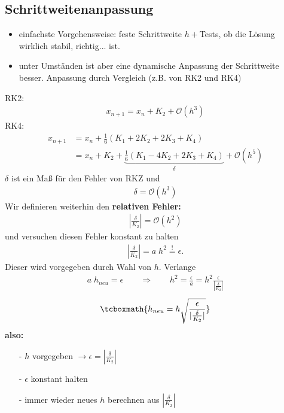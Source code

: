 \documentclass[12pt]{article}
\begin{document}
\subsection{Schrittweitenanpassung}
\begin{itemize}
\item einfachste Vorgehensweise: feste Schrittweite $h +$Tests, ob die Lösung wirklich stabil, richtig... ist.
\item unter Umständen ist aber eine dynamische Anpassung der Schrittweite besser. Anpassung durch Vergleich (z.B. von RK2 und RK4) \\
\end{itemize}

RK2: \begin{align}
x_{n+1} = x_n + K_2 + \mathcal{O}(h^3)
\end{align}
RK4: \begin{align}
x_{n+1} &= x_n + \frac{1}{6} (K_1 + 2K_2 +2K_3 + K_4) \\
&= x_n + K_2 + \underbrace{\frac{1}{6} (K_1 - 4K_2 + 2K_3 +K_4)}_\delta + \mathcal{O}(h^5)
\end{align}
$\delta$ ist ein Maß für den Fehler von RKZ und 
\begin{align*}
\delta = \mathcal{O}(h^3)
\end{align*} 
Wir definieren weiterhin den \textbf{relativen Fehler:} 
\begin{align}
\left| \frac{\delta}{K_2} \right| = \mathcal{O}(h^2)
\end{align}
und versuchen diesen Fehler konstant zu halten
\begin{align}
\left| \frac{\delta}{K_2} \right| = a\; h^2 \overset{!}{=} \epsilon.
\end{align}
Dieser wird vorgegeben durch Wahl von $h$. Verlange 
\begin{align}
a \;  h_{neu}= \epsilon \qquad \Rightarrow \qquad h^2 = \frac{\epsilon}{a} = h^2 \frac{\epsilon}{\left| \frac{\delta}{K_2} \right|} 
\end{align}
\begin{align}
\tcboxmath{ h_{neu} = h \sqrt{\frac{\epsilon}{\vert \frac{\delta}{K_2} \vert }}}
\end{align}
\textbf{also:} 
\begin{itemize}
\item[-] $h$ vorgegeben $
\to \epsilon = \left| \frac{\delta}{K_2} \right| $
\item[-] $\epsilon$ konstant halten 
\item[-] immer wieder neues $h$ berechnen aus $ \left| \frac{\delta}{K_2} \right|$
\end{itemize}
\end{document}

